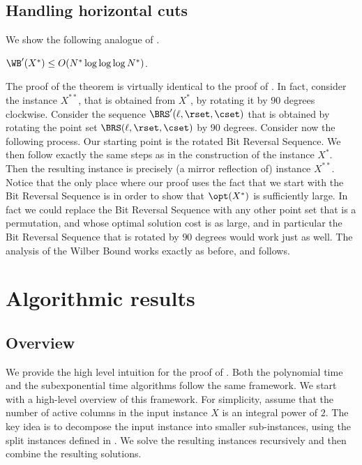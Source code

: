 \documentclass{toc}
\begin{document}
%
%
%
%
\subsection{Handling horizontal cuts}\label{subsec: bounding WB horizontal}
%
%
%
%
We show the following analogue of .

\begin{theorem}\label{thm: boundinb WB horizontal}
	$\WB'(X^*)\leq O(N^*\log\log\log N^*)$.
\end{theorem}

The proof of the theorem is virtually identical to the proof of . 
In fact, consider the instance $X^{**}$, that is obtained from $X^*$, by rotating it by $90$ degrees clockwise.
Consider the sequence $\BRS'(\ell, \rset, \cset)$ that is obtained by rotating the point set $\BRS(\ell, \rset, \cset)$ by $90$ degrees.  
%
Consider now the following process. Our starting point is the rotated Bit Reversal Sequence. We then follow exactly the same steps as in the construction of the instance $X^*$. 
Then the resulting instance is precisely (a mirror reflection of) instance $X^{**}$.
Notice that the only place where our proof uses the fact that we start with the Bit Reversal Sequence is in order to show that $\opt(X^*)$ is sufficiently large. In fact we could replace the Bit Reversal Sequence with any other point set that is a permutation, and whose optimal solution cost is as large, and in particular the Bit Reversal Sequence that is rotated by $90$ degrees would work just as well. The analysis of the Wilber Bound works exactly as before, and  follows.




%

\section{Algorithmic results} 
\label{sec: algo} 
\newcommand{\pedit}[1]{\textcolor{red}{#1}}

\subsection{Overview} 

We provide the high level intuition for the proof of . Both the polynomial time and the subexponential time algorithms follow the same framework. We start with a high-level overview of this framework. For simplicity, assume that the number of active columns in the input instance $X$ is an integral power of $2$.
The key idea is to decompose the input instance into smaller sub-instances,  using the split instances defined in . We solve the resulting instances recursively and then combine the resulting solutions.
\end{document}
